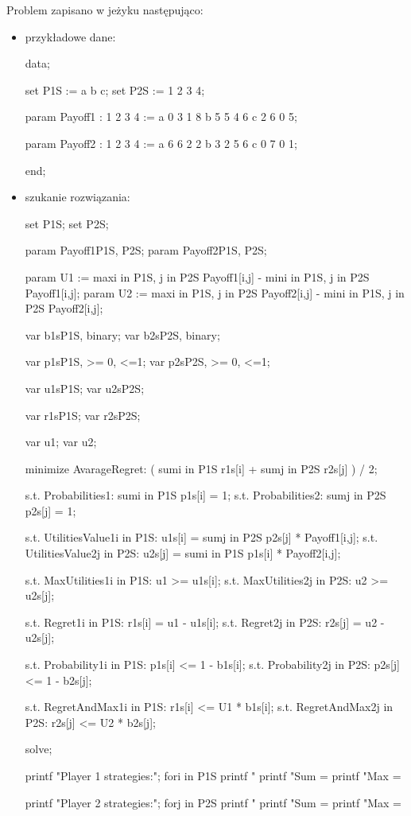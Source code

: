 \documentclass[polish]{standalone}
\begin{document}
Problem zapisano w jeżyku  następująco:
\begin{itemize}
\item przykładowe dane:
\begin{code}
data;
 
set P1S := a b c;
set P2S := 1 2 3 4;
 
param Payoff1
    :  1  2  3  4 :=
    a  0  3  1  8
    b  5  5  4  6
    c  2  6  0  5;
 
param Payoff2
    :  1  2  3  4 :=
    a  6  6  2  2
    b  3  2  5  6
    c  0  7  0  1;
 
end;
\end{code}
\item szukanie rozwiązania:
\begin{code}
set P1S;
set P2S;
 
param Payoff1{P1S, P2S};
param Payoff2{P1S, P2S};
 
param U1 := max{i in P1S, j in P2S}
  Payoff1[i,j] - min{i in P1S, j in P2S} Payoff1[i,j];
param U2 := max{i in P1S, j in P2S}
  Payoff2[i,j] - min{i in P1S, j in P2S} Payoff2[i,j];
 
var b1s{P1S}, binary;
var b2s{P2S}, binary;
 
var p1s{P1S}, >= 0, <=1;
var p2s{P2S}, >= 0, <=1;
 
var u1s{P1S};
var u2s{P2S};
 
var r1s{P1S};
var r2s{P2S};
 
var u1;
var u2;
 
minimize AvarageRegret:
  ( sum{i in P1S} r1s[i] + sum{j in P2S} r2s[j] ) / 2;
 
s.t. Probabilities1:
	sum{i in P1S} p1s[i] = 1;
s.t. Probabilities2:
	sum{j in P2S} p2s[j] = 1;
 
s.t. UtilitiesValue1{i in P1S}:
	u1s[i] = sum{j in P2S} p2s[j] * Payoff1[i,j];
s.t. UtilitiesValue2{j in P2S}:
	u2s[j] = sum{i in P1S} p1s[i] * Payoff2[i,j];
 
s.t. MaxUtilities1{i in P1S}:
	u1 >= u1s[i];
s.t. MaxUtilities2{j in P2S}:
	u2 >= u2s[j];
 
s.t. Regret1{i in P1S}:
	r1s[i] = u1 - u1s[i];
s.t. Regret2{j in P2S}:
	r2s[j] = u2 - u2s[j];
 
s.t. Probability1{i in P1S}:
	p1s[i] <= 1 - b1s[i];
s.t. Probability2{j in P2S}:
	p2s[j] <= 1 - b2s[j];
 
s.t. RegretAndMax1{i in P1S}:
	r1s[i] <= U1 * b1s[i];
s.t. RegretAndMax2{j in P2S}:
	r2s[j] <= U2 * b2s[j];
 
solve;
 
printf "Player 1 strategies:\n";
for{i in P1S}
	printf "%
printf "Sum = %
printf "Max = %
 
printf "Player 2 strategies:\n";
for{j in P2S}
	printf "%
printf "Sum = %
printf "Max = %
\end{code}
\end{itemize}
\end{document}
